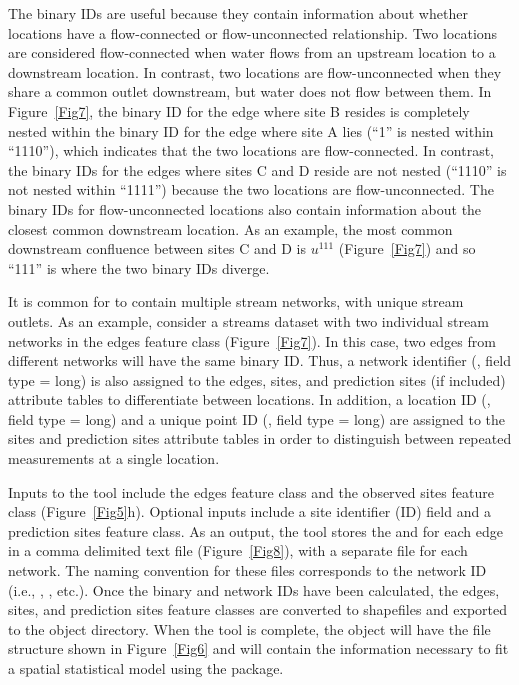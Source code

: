 \documentclass[article]{jss}
\begin{document}
The binary IDs are useful because they contain information about whether locations have a flow-connected or flow-unconnected relationship. Two locations are considered flow-connected when water flows from an upstream location to a downstream location. In contrast, two locations are flow-unconnected when they share a common outlet downstream, but water does not flow between them. In Figure~\ref{Fig7}, the binary ID for the edge where site B resides is completely nested within the binary ID for the edge where site A lies (``1'' is nested within ``1110''), which indicates that the two locations are flow-connected. In contrast, the binary IDs for the edges where sites C and D reside are not nested (``1110'' is not nested within ``1111'') because the two locations are flow-unconnected. The binary IDs for flow-unconnected locations also contain information about the closest common downstream location. As an example, the most common downstream confluence between sites C and D is $u^{111}$ (Figure~\ref{Fig7}) and so ``111'' is where the two binary IDs diverge.

It is common for  to contain multiple stream networks, with unique
stream outlets. As an example, consider a streams dataset with two
individual stream networks in the edges feature class
(Figure~\ref{Fig7}). In this case, two edges from different networks
will have the same binary ID. Thus, a network identifier
(, field type = long) is also assigned to the edges,
sites, and prediction sites (if included) attribute tables to differentiate between locations. In addition, a
location ID (, field type = long) and a unique point ID
(, field type = long) are assigned to the sites and
prediction sites attribute tables in order to distinguish between repeated measurements at a single location.

Inputs to the  tool include the 
edges feature class and the  observed sites feature
class (Figure~\ref{Fig5}h). Optional inputs include a site identifier (ID) field and a
prediction sites feature class. As an output, the  tool stores the  and  for each edge in a
comma delimited text file (Figure~\ref{Fig8}), with a separate file
for each network. The naming convention for these files corresponds to
the network ID (i.e., , , etc.).  Once
the binary and network IDs have been calculated, the edges, sites, and
prediction sites feature classes are converted to shapefiles and
exported to the  object directory. When the  tool is complete, the  object will have the file structure shown in Figure~\ref{Fig6} and will contain the information necessary to fit a spatial statistical model using the  package.
\end{document}
